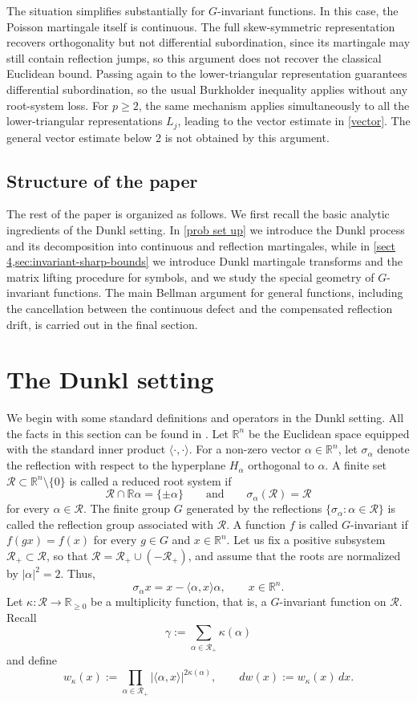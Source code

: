 \documentclass[11pt]{amsart}
\theoremstyle{definition}
\theoremstyle{remark}
\numberwithin{equation}{section}
\newcommand{\R}{\mathbb{R}}
\newcommand{\RR}{\mathcal{R}}
\begin{document}
The situation simplifies substantially for $G$-invariant functions. In this case, the Poisson martingale itself is continuous. The full skew-symmetric representation recovers orthogonality but not differential subordination, since its martingale may still contain reflection jumps, so this argument does not recover the classical Euclidean bound. Passing again to the lower-triangular representation guarantees differential subordination, so the usual Burkholder inequality applies without any root-system loss. For $p\geq2$, the same mechanism applies simultaneously to all the lower-triangular representations $L_j$, leading to the vector estimate in \cref{vector}. The general vector estimate below $2$ is not obtained by this argument. \\

\subsection{Structure of the paper}
The rest of the paper is organized as follows. We first recall the basic analytic ingredients of the Dunkl setting. In \cref{prob set up} we introduce the Dunkl process and its decomposition into continuous and reflection martingales, while in \cref{sect 4,sec:invariant-sharp-bounds} we introduce Dunkl martingale transforms and the matrix lifting procedure for symbols, and we study the special geometry of $G$-invariant functions. The main Bellman argument for general functions, including the cancellation between the continuous defect and the compensated reflection drift, is carried out in the final section.

\section{The Dunkl setting}

We begin with some standard definitions and operators in the Dunkl setting.
All the facts in this section can be found in
\cite{dunkl,dunklbook,Dunkl87,DziubanskiHejna2019,DziubanskiHejna2022,Rosler2002}. Let $\R^n$ be the Euclidean space equipped with the standard inner product
$\langle\cdot,\cdot\rangle$. For a non-zero vector $\alpha\in\R^n$, let
$\sigma_\alpha$ denote the reflection with respect to the hyperplane
$H_\alpha$ orthogonal to $\alpha$. A finite set
$\RR\subset\R^n\setminus\{0\}$ is called a reduced root system if
\[
\RR\cap\mathbb R\alpha=\{\pm\alpha\}
\qquad\text{and}\qquad
\sigma_\alpha(\RR)=\RR
\]
for every $\alpha\in\RR$. The finite group $G$ generated by the reflections
$\{\sigma_\alpha:\alpha\in\RR\}$ is called the reflection group associated
with $\RR$. A function $f$ is called $G$-invariant if
$f(gx)=f(x)$ for every $g\in G$ and $x\in\R^n$. Let us fix a positive subsystem $\RR_+\subset\RR$, so that
$\RR=\RR_+\cup(-\RR_+)$, and assume that the roots are normalized by
$|\alpha|^2=2$. Thus,
\[
\sigma_\alpha x
=
x-\langle\alpha,x\rangle\alpha,
\qquad x\in\R^n.
\]
Let $\kappa:\RR\to\R_{\geq0}$ be a multiplicity function, that is, a
$G$-invariant function on $\RR$. Recall
\[
\gamma:=\sum_{\alpha\in\RR_+}\kappa(\alpha)
\]
and define
\[
w_\kappa(x)
:=
\prod_{\alpha\in\RR_+}
|\langle\alpha,x\rangle|^{2\kappa(\alpha)},
\qquad
dw(x):=w_\kappa(x)\,dx.
\]
\end{document}
